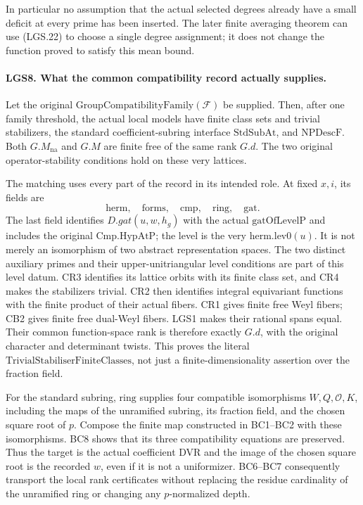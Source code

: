 \documentclass[11pt,a4paper]{article}
\numberwithin{equation}{section}
\theoremstyle{remark}\newtheorem{remark}[theorem]{Remark}
\begin{document}
In particular no assumption that the actual selected
degrees already have a small deficit at every prime has
been inserted.  The later finite averaging theorem can
use (LGS.22) to choose a single degree assignment; it does
not change the function proved to satisfy this mean bound.

\paragraph{LGS8. What the common compatibility record actually supplies.}
\label{claim:LGS8}
Let the original \(\mathrm{GroupCompatibilityFamily}(\mathcal F)\)
be supplied.  Then, after one family threshold, the actual
local models have finite class sets and trivial stabilizers,
the standard coefficient-subring interface
\(\mathrm{StdSubAt}\), and \(\mathrm{NPDescF}\).
Both \(G.M_{\mathrm{na}}\) and \(G.M\) are finite free of the
same rank \(G.d\).  The two original operator-stability
conditions hold on these very lattices.

The matching uses every part of the record in its intended
role.  At fixed \(x,i\), its fields are
\[
 \mathrm{herm},\quad \mathrm{forms},\quad
 \mathrm{cmp},\quad \mathrm{ring},\quad \mathrm{gat}.    \tag{LGS.24}
\]
The last field identifies \(D.gat(u,w,h_g)\) with the
actual \(\mathrm{gatOfLevelP}\) and includes the original
\(\mathrm{Cmp.HypAtP}\); the level is the very
\(\mathrm{herm.lev0}(u)\).  It is not merely an isomorphism
of two abstract representation spaces.
The two distinct auxiliary primes and their
upper-unitriangular level conditions are part of this
level datum.  CR3 identifies its lattice orbits with its
finite class set, and CR4 makes the stabilizers trivial.
CR2 then identifies integral equivariant functions with
the finite product of their actual fibers.  CR1 gives
finite free Weyl fibers; CB2 gives finite free
dual-Weyl fibers.  LGS1 makes their rational spans equal.
Their common function-space rank is therefore exactly
\(G.d\), with the original character and determinant
twists.  This proves the literal
\(\mathrm{TrivialStabiliserFiniteClasses}\), not just a
finite-dimensionality assertion over the fraction field.

For the standard subring, \(\mathrm{ring}\) supplies four
compatible isomorphisms \(W,Q,\mathcal O,K\), including the
maps of the unramified subring, its fraction field, and
the chosen square root of \(p\).  Compose the finite map
constructed in BC1--BC2 with these isomorphisms.
BC8 shows that its three compatibility equations are
preserved.  Thus the target is the actual coefficient
DVR and the image of the chosen square root is the
recorded \(w\), even if it is not a uniformizer.
BC6--BC7 consequently transport the local rank
certificates without replacing the residue cardinality
of the unramified ring or changing any \(p\)-normalized
depth.
\end{document}
